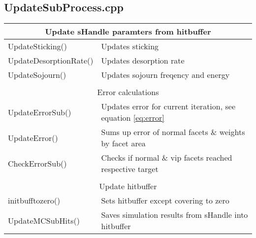 \subsection{UpdateSubProcess.cpp}

\begin{center}
\begin{tabular}{|l|l|}
\hline
\multicolumn{2}{|c|}{\rule{0pt}{3ex}Update sHandle paramters from hitbuffer}\\
\hline
\rule{0pt}{3ex} UpdateSticking()& Updates sticking\\
\rule{0pt}{3ex} UpdateDesorptionRate()& Updates desorption rate \\
\rule{0pt}{3ex} UpdateSojourn()& Updates sojourn freqency and energy \\
\hline
\multicolumn{2}{l}{}\\
\hline
\multicolumn{2}{|c|}{\rule{0pt}{3ex}Error calculations}\\
\hline
\rule{0pt}{3ex} UpdateErrorSub()& Updates  error for current iteration, see equation \ref{eq:error}\\
\rule{0pt}{3ex} UpdateError()& Sums up error of normal facets \& weights by facet area\\
\rule{0pt}{3ex} CheckErrorSub()& Checks if normal \& vip facets reached respective target\\
\hline
\multicolumn{2}{l}{}\\
\hline
\multicolumn{2}{|c|}{\rule{0pt}{3ex}Update hitbuffer}\\
\hline
\rule{0pt}{3ex} initbufftozero()& Sets hitbuffer except covering to zero\\
\rule{0pt}{3ex} UpdateMCSubHits()& Saves simulation results from sHandle into hitbuffer\\
\hline
\end{tabular}
\end{center}

